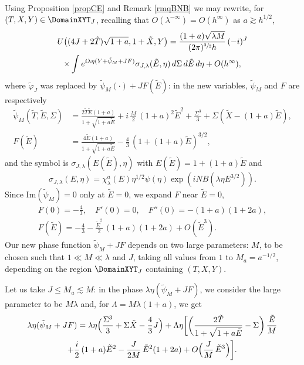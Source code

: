 Using Proposition \ref{propCE} and Remark \ref{rmqBNB} we may rewrite, for $(T,X,Y)\in \DomainXYT_{J}$, recalling that $O(\lambda^{-\infty})=O(h^{\infty})$ as $a\gtrsim h^{1/2}$,
\begin{multline}
\label{eq:67}
U\bigl((4J+2\tilde T)\sqrt{1+a},1+\tilde X,Y\bigr) = \frac{(1+a)\sqrt {\lambda M}}{(2\pi)^{\sfrac 32}h}\, (-i)^{J} \\
\times \int e^{i\lambda\eta (Y+\tilde\psi_{M}+JF)} \sigma_{J,\lambda }(\tilde E,\eta)\,d\Sigma \,d{\tilde E} \,d\eta +O(h^{\infty}),
\end{multline}
where $\tilde\varphi_J$ was replaced by $\tilde\psi_{M}(\cdot)+JF({\tilde E})$: in the new variables, $\tilde\psi_{M}$ and $F$ are respectively
\begin{align*}
\tilde\psi_{M} (\tilde T,{\tilde E},\Sigma) & =\frac{2\tilde T {\tilde E}(1+a)}{1+\sqrt{1+a{\tilde E}}}+i\,\frac M2\, (1+a)^2 {\tilde E}^2+\frac{\Sigma^3}{3}+\Sigma(\tilde X-(1+a){\tilde E}), \\
\label{eq:68}
F({\tilde E}) & =\frac{4{\tilde E}(1+a)}{1+\sqrt{1+a{\tilde E}}}-\frac 43\, (1+(1+a){\tilde E})^{3/2},
\end{align*}
and the symbol is $\sigma_{J,\lambda}(E(\tilde E),\eta)$ with $E(\tilde E)=1+(1+a)\tilde E$ and
\[
\sigma_{J,\lambda}(E,\eta)=\chi^a_{\lambda}(E)\eta^{1/2}\psi(\eta) \exp(i NB(\lambda \eta E^{3/2})).
\]
Since $\mathrm{Im}(\tilde\psi_{M})=0$ only at ${\tilde E}=0$, we expand $F$ near ${\tilde E}=0$,
\begin{gather*}
F(0)=-\frac 43, \quad F'(0)=0, \quad F''(0)=-(1+a)(1+2a),\\
F({\tilde E})= -\frac 43-\frac{{\tilde E}^2}{2}\,(1+a)(1+2a)+O({\tilde E}^3).
\end{gather*}
Our new phase function $\tilde\psi_{M}+JF$ depends on two large parameters: $M$, to be chosen such that $1\ll M\ll\lambda $ and $J$, taking all values from $1$ to $M_a=a^{-1/2}$, depending on the region $\DomainXYT_J$ containing $(T,X,Y)$.

Let us take $J\leq M_a\lesssim M$: in the phase $\lambda\eta(\tilde\psi_{M}+JF)$, we consider the large parameter to be $M\lambda$ and, for $\Lambda= M \lambda (1+a)$, we get
\begin{multline*}\label{eq:phaUj}
\lambda\eta(\tilde\psi_{M}+JF)=\lambda \eta \Big(\frac{\Sigma^3}{3}+\Sigma \tilde X-\frac 43 J\Big)+
\Lambda \eta\biggl[\biggl(\frac{2\tilde T}{1+\sqrt{1+a{\tilde E}}}-\Sigma\biggr)\,\frac {\tilde E}M\\
+\frac i2\, (1+a){\tilde E}^2-\frac{J}{2M}\,{\tilde E}^2(1+2a)+O\Bigl(\frac{J}{M}\,{\tilde E}^3\Bigr)\biggr].
\end{multline*}

